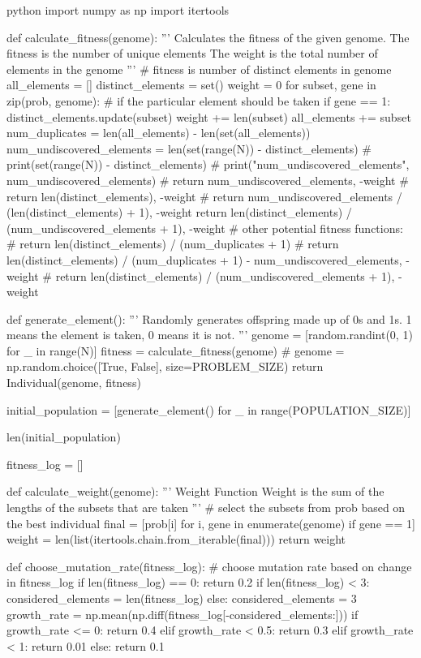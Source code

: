 \begin{mintedbox}{python}
import numpy as np
import itertools

def calculate_fitness(genome):
    '''
    Calculates the fitness of the given genome.
    The fitness is the number of unique elements
    The weight is the total number of elements in the genome
    '''
    # fitness is number of distinct elements in genome
    all_elements = []
    distinct_elements = set()
    weight = 0
    for subset, gene in zip(prob, genome):
        # if the particular element should be taken
        if gene == 1:
            distinct_elements.update(subset)
            weight += len(subset)
            all_elements += subset
    num_duplicates = len(all_elements) - len(set(all_elements))
    num_undiscovered_elements = len(set(range(N)) - distinct_elements)
    # print(set(range(N)) - distinct_elements)
    # print("num_undiscovered_elements", num_undiscovered_elements)
    # return num_undiscovered_elements, -weight
    # return len(distinct_elements), -weight
    # return num_undiscovered_elements / (len(distinct_elements) + 1), -weight
    return len(distinct_elements) / (num_undiscovered_elements + 1), -weight
    # other potential fitness functions:
    # return len(distinct_elements) / (num_duplicates + 1)
    # return len(distinct_elements) / (num_duplicates + 1) - num_undiscovered_elements, -weight
    # return len(distinct_elements) / (num_undiscovered_elements + 1), -weight

def generate_element():
    '''
    Randomly generates offspring made up of 0s and 1s.
    1 means the element is taken, 0 means it is not.
    '''
    genome = [random.randint(0, 1) for _ in range(N)]
    fitness = calculate_fitness(genome)
    # genome = np.random.choice([True, False], size=PROBLEM_SIZE)
    return Individual(genome, fitness)

initial_population = [generate_element() for _ in range(POPULATION_SIZE)]

len(initial_population)

fitness_log = []

def calculate_weight(genome):
    '''
    Weight Function
    Weight is the sum of the lengths of the subsets that are taken
    '''
    # select the subsets from prob based on the best individual
    final = [prob[i] for i, gene in enumerate(genome) if gene == 1]
    weight = len(list(itertools.chain.from_iterable(final)))
    return weight

def choose_mutation_rate(fitness_log):
    # choose mutation rate based on change in fitness_log
    if len(fitness_log) == 0:
        return 0.2
    if len(fitness_log) < 3:
        considered_elements = len(fitness_log)
    else:
        considered_elements = 3
    growth_rate = np.mean(np.diff(fitness_log[-considered_elements:]))
    if growth_rate <= 0:
        return 0.4
    elif growth_rate < 0.5:
        return 0.3
    elif growth_rate < 1:
        return 0.01
    else:
        return 0.1


\end{mintedbox}
